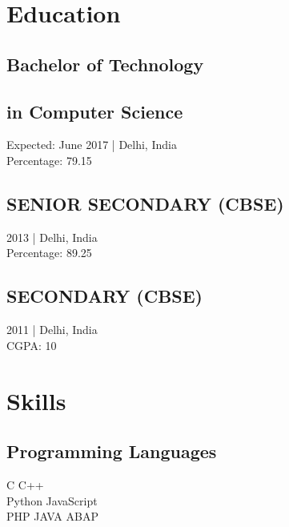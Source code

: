 \documentclass[]{resume-openfont}
\begin{document}
%
%



%
%

\begin{minipage}[t]{0.28\textwidth} 


\section{Education} 

\subsection{Bachelor of Technology} \subsection{in Computer Science}
Expected: June 2017 | Delhi, India \\ Percentage: 79.15
\sectionsep

\subsection{SENIOR SECONDARY (CBSE)}
2013 | Delhi, India \\ Percentage: 89.25
\sectionsep

\subsection{SECONDARY (CBSE)}
2011 | Delhi, India \\ CGPA: 10
\sectionsep


\section{Skills}
\subsection{Programming Languages}
C \textbullet{} C++ \\
Python \textbullet{} JavaScript\\
PHP \textbullet{} JAVA \textbullet{} ABAP\\
\sectionsep

\end{minipage}
\end{document}

